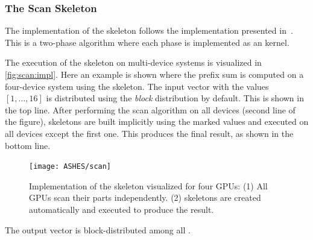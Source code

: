 \subsubsection{The Scan Skeleton}
The implementation of the \scan skeleton follows the implementation presented in~\cite{HarrisSeOw2007}.
This is a two-phase algorithm where each phase is implemented as an \OpenCL kernel.

The execution of the \scan skeleton on multi-device systems is visualized in \autoref{fig:scan:impl}.
Here an example is shown where the prefix sum is computed on a four-device system using the \scan skeleton.
The input vector with the values $[1,\ldots,16]$ is distributed using the \emph{block} distribution by default.
This is shown in the top line.
After performing the scan algorithm on all devices (second line of the figure), \map skeletons are built implicitly using the marked values and executed on all devices except the first one.
This produces the final result, as shown in the bottom line.

\begin{figure}[tbp]
    \centering
    \texttt{[image: ASHES/scan]}
    \caption[Implementation of the \scan skeleton.]%
            {Implementation of the \scan skeleton visualized for four GPUs:
            (1) All GPUs scan their parts independently.
            (2) \map skeletons are created automatically and
             executed to produce the result.}
    \label{fig:scan:impl}
\end{figure}

The output vector is block-distributed among all \GPUs.





